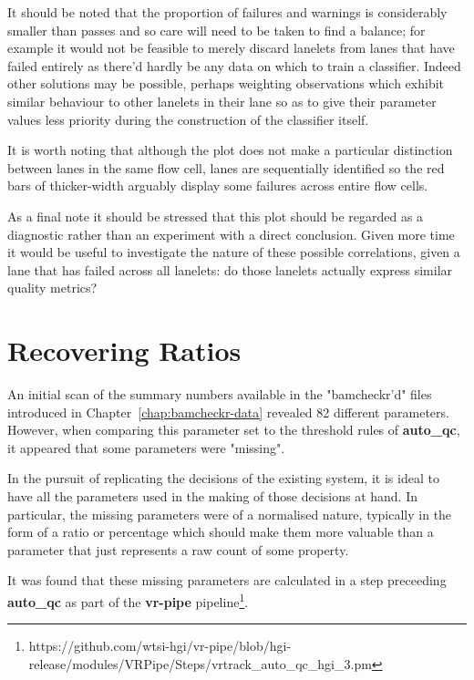 It should be
noted that the proportion of failures and warnings is considerably smaller than
passes and so care will need to be taken to find a balance; for example it would
not be feasible to merely discard lanelets from lanes that have failed entirely
as there'd hardly be any data on which to train a classifier. Indeed other
solutions may be possible, perhaps weighting observations which exhibit similar
behaviour to other lanelets in their lane so as to give their parameter values
less priority during the construction of the classifier itself.

It is worth noting that although the plot does not make a particular
distinction between lanes in the same flow cell, lanes are sequentially
identified so the red bars of thicker-width arguably display some failures
across entire flow cells.

As a final note it should be stressed that this plot should be regarded as a
diagnostic rather than an experiment with a direct conclusion. Given more time it
would be useful to investigate the nature of these possible correlations, given
a lane that has failed across all lanelets: do those lanelets actually express
similar quality metrics?

\section{Recovering Ratios}

An initial scan of the summary numbers available in the "bamcheckr'd" files
introduced in Chapter~\ref{chap:bamcheckr-data} revealed 82 different
parameters. However, when comparing this parameter set to the threshold rules of
\textbf{auto\_qc}, it appeared that some parameters were "missing".

In the pursuit of replicating the decisions of the
existing system, it is ideal to have all the parameters used in the making of
those decisions at hand. In particular, the missing parameters were of a
normalised nature, typically in the form of a ratio or percentage which should
make them more valuable than a parameter that just represents a raw count of
some property.

It was found that these missing parameters are calculated in a step preceeding
\textbf{auto\_qc} as part of the \textbf{vr-pipe}
pipeline\footnote{https://github.com/wtsi-hgi/vr-pipe/blob/hgi-release/modules/VRPipe/Steps/vrtrack\_auto\_qc\_hgi\_3.pm}.

